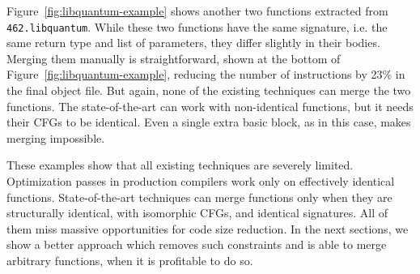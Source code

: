 Figure~\ref{fig:libquantum-example} shows another two functions extracted from \texttt{462.libquantum}. While these two functions have the
same signature, i.e. the same return type and list of parameters, they differ slightly in their bodies. Merging them manually
is straightforward, shown at the bottom of Figure~\ref{fig:libquantum-example}, reducing the number of instructions by 23\% in the final object file. But again,
none of the existing techniques can merge the two functions. The state-of-the-art can work with non-identical functions, but it needs
their CFGs to be identical. Even a single extra basic block, as in this case, makes merging impossible.

These examples show that all existing techniques are severely limited. Optimization passes in production compilers work only on effectively
identical functions. State-of-the-art techniques can merge functions only when they are structurally identical, with isomorphic CFGs, and identical signatures. All of them miss massive opportunities for code size reduction. In the next sections, we show a better approach which
removes such constraints and is able to merge arbitrary functions, when it is profitable to do so.
